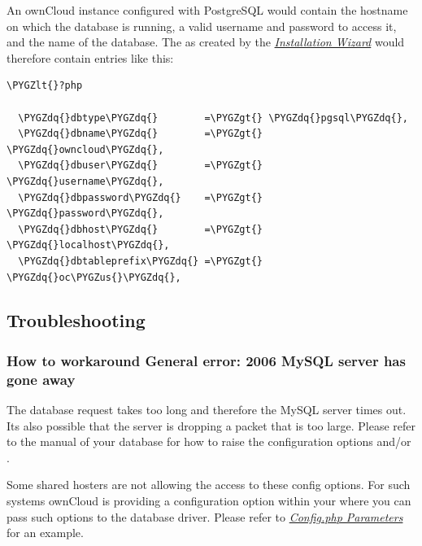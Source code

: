 \documentclass[letterpaper,10pt,english]{sphinxmanual}
\def\PYGZus{\char`\_}
\def\PYGZlt{\char`\<}
\def\PYGZgt{\char`\>}
\def\PYGZdq{\char`\"}
\begin{document}
An ownCloud instance configured with PostgreSQL would contain the hostname on
which the database is running, a valid username and password to access it, and
the name of the database. The  as created by the
{\hyperref[installation/installation_wizard::doc]{\emph{\emph{Installation Wizard}}}} would therefore contain entries like
this:

\begin{Verbatim}[commandchars=\\\{\}]
\PYGZlt{}?php

  \PYGZdq{}dbtype\PYGZdq{}        =\PYGZgt{} \PYGZdq{}pgsql\PYGZdq{},
  \PYGZdq{}dbname\PYGZdq{}        =\PYGZgt{} \PYGZdq{}owncloud\PYGZdq{},
  \PYGZdq{}dbuser\PYGZdq{}        =\PYGZgt{} \PYGZdq{}username\PYGZdq{},
  \PYGZdq{}dbpassword\PYGZdq{}    =\PYGZgt{} \PYGZdq{}password\PYGZdq{},
  \PYGZdq{}dbhost\PYGZdq{}        =\PYGZgt{} \PYGZdq{}localhost\PYGZdq{},
  \PYGZdq{}dbtableprefix\PYGZdq{} =\PYGZgt{} \PYGZdq{}oc\PYGZus{}\PYGZdq{},
\end{Verbatim}


\subsection{Troubleshooting}
\label{configuration_database/linux_database_configuration:troubleshooting}\label{configuration_database/linux_database_configuration:db-troubleshooting-label}

\subsubsection{How to workaround General error: 2006 MySQL server has gone away}
\label{configuration_database/linux_database_configuration:how-to-workaround-general-error-2006-mysql-server-has-gone-away}
The database request takes too long and therefore the MySQL server times out. Its
also possible that the server is dropping a packet that is too large. Please
refer to the manual of your database for how to raise the configuration options
 and/or .

Some shared hosters are not allowing the access to these config options. For such
systems ownCloud is providing a  configuration option within your
 where you can pass such options to the database driver.
Please refer to {\hyperref[configuration_server/config_sample_php_parameters::doc]{\emph{\emph{Config.php Parameters}}}} for an example.
\end{document}
